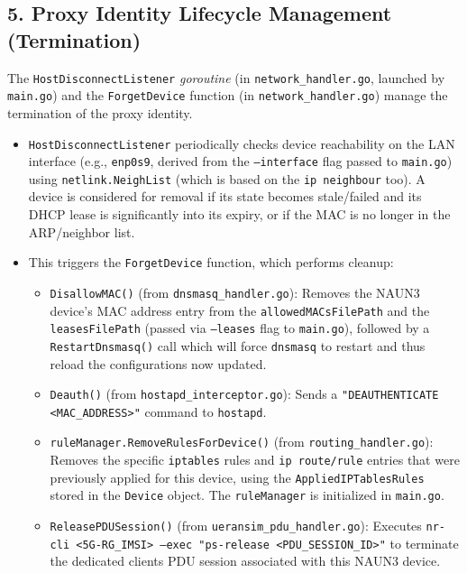 \subsection{5. Proxy Identity Lifecycle Management (Termination)}

The \texttt{HostDisconnectListener} \textit{goroutine} (in \texttt{network\_handler.go}, launched by \texttt{main.go}) and the \texttt{ForgetDevice} function (in \texttt{network\_handler.go}) manage the termination of the proxy identity.

\begin{itemize}
    \item \texttt{HostDisconnectListener} periodically checks device reachability on the \ac{LAN} interface (e.g., \texttt{enp0s9}, derived from the \texttt{--interface} flag passed to \texttt{main.go}) using \texttt{netlink.NeighList} (which is based on the \texttt{ip neighbour} too). A device is considered for removal if its state becomes stale/failed and its \ac{DHCP} lease is significantly into its expiry, or if the \ac{MAC} is no longer in the \ac{ARP}/neighbor list.

    \item{
        This triggers the \texttt{ForgetDevice} function, which performs cleanup:
        \begin{itemize}
            \item \texttt{DisallowMAC()} (from \texttt{dnsmasq\_handler.go}): Removes the \ac{NAUN3} device's \ac{MAC} address entry from the \texttt{allowedMACsFilePath} and the \texttt{leasesFilePath} (passed via \texttt{--leases} flag to \texttt{main.go}), followed by a \texttt{RestartDnsmasq()} call which will force \texttt{dnsmasq} to restart and thus reload the configurations now updated.

            \item \texttt{Deauth()} (from \texttt{hostapd\_interceptor.go}): Sends a \texttt{"DEAUTHENTICATE <MAC\_ADDRESS>"} command to \texttt{hostapd}.

            \item \texttt{ruleManager.RemoveRulesForDevice()} (from \texttt{routing\_handler.go}): Removes the specific \texttt{iptables} rules and \texttt{ip route/rule} entries that were previously applied for this device, using the \texttt{AppliedIPTablesRules} stored in the \texttt{Device} object. The \texttt{ruleManager} is initialized in \texttt{main.go}.

            \item \texttt{ReleasePDUSession()} (from \texttt{ueransim\_pdu\_handler.go}): Executes \texttt{nr-cli <5G-RG\_IMSI> --exec "ps-release <PDU\_SESSION\_ID>"} to terminate the dedicated clients \ac{PDU} session associated with this \ac{NAUN3} device.


\end{itemize}}
\end{itemize}
